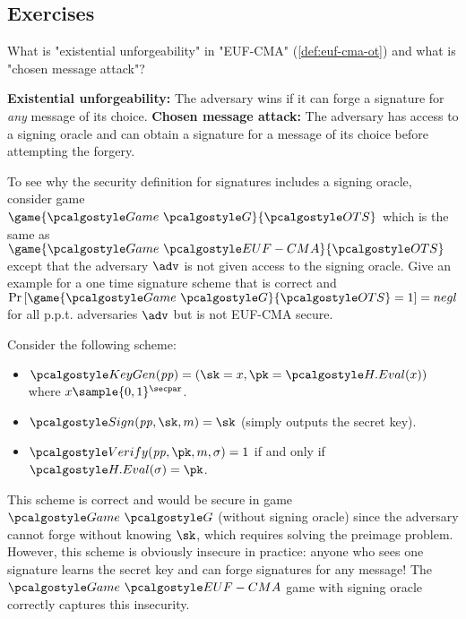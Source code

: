 \subsection{Exercises}

\begin{exercise}
  What is "existential unforgeability" in "EUF-CMA" (\autoref{def:euf-cma-ot}) and what is "chosen message attack"?
\end{exercise}

\ifsolutions
\begin{mysolution}
  \textbf{Existential unforgeability:} The adversary wins if it can forge a signature for \emph{any} message of its choice.
  \textbf{Chosen message attack:} The adversary has access to a signing oracle and can obtain a signature for a message of its choice before attempting the forgery.
\end{mysolution}
\fi

\begin{exercise}
  To see why the security definition for signatures includes a signing oracle, consider game $\game{\Game~\algo{G}}{\algo{OTS}}$ which is the same as $\game{\Game~\algo{EUF-CMA}}{\algo{OTS}}$ except that the adversary $\adv$ is not given access to the signing oracle.
  Give an example for a one time signature scheme that is correct and $\pr{\game{\Game~\algo{G}}{\algo{OTS}} = 1} = negl$ for all p.p.t. adversaries $\adv$ but is not EUF-CMA secure.
\end{exercise}

\ifsolutions
\begin{mysolution}
  Consider the following scheme:
  \begin{itemize}
      \item $\algo{KeyGen}(\params) = (\sk = x, \pk = \algo{H.Eval}(x))$ where $x \sample \{0,1\}^\secpar$.
      \item $\algo{Sign}(\params, \sk, m) = \sk$ (simply outputs the secret key).
      \item $\algo{Verify}(\params, \pk, m, \sigma) = 1$ if and only if $\algo{H.Eval}(\sigma) = \pk$.
  \end{itemize}
  This scheme is correct and would be secure in game $\Game~\algo{G}$ (without signing oracle) since the adversary cannot forge without knowing $\sk$, which requires solving the preimage problem.
  However, this scheme is obviously insecure in practice: anyone who sees one signature learns the secret key and can forge signatures for any message!
  The $\Game~\algo{EUF-CMA}$ game with signing oracle correctly captures this insecurity.
\end{mysolution}
\fi

